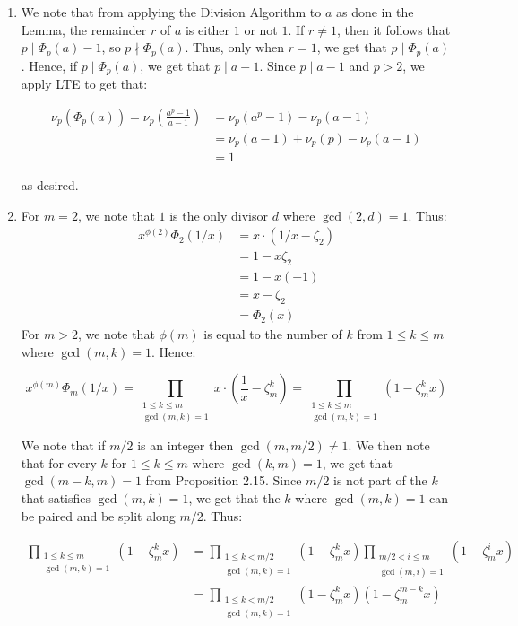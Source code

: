 \documentclass{article}
\begin{document}
\begin{enumerate}
\begin{enumerate}
    \item 
    We note that from applying the Division Algorithm to $a$ as done in the Lemma, the remainder $r$ of $a$ is either $1$ or not $1$. If $r \neq 1$, then it follows that $p \mid \Phi_p(a) - 1$, so $p \nmid \Phi_p(a)$. Thus, only when $r = 1$, we get that $p \mid \Phi_p(a)$. Hence, if $p \mid \Phi_p(a)$, we get that $p \mid a - 1$. Since $p \mid a - 1$ and $p > 2$, we apply LTE to get that: 

    \begin{align*}
        \nu_p(\Phi_p(a)) = \nu_p\left(\frac{a^p - 1}{a - 1}\right) &= \nu_p(a^p - 1) - \nu_p(a-1)\\
        &= \nu_p(a - 1) + \nu_p(p) - \nu_p(a-1)\\
        &= 1
    \end{align*}    

    as desired. \\

    \item 
    For $m = 2$, we note that $1$ is the only divisor $d$ where $\gcd(2, d) = 1$. Thus:
    \begin{align*}
        x^{\phi(2)}\Phi_2(1/x) &= x \cdot (1/x - \zeta_2) \\
        &= 1 - x\zeta_2 \\ 
        &= 1 - x(-1) \\\
        &= x - \zeta_2\\
        &= \Phi_2(x)
    \end{align*}
    For $m > 2$, we note that $\phi(m)$ is equal to the number of $k$ from $1 \leq k \leq m$ where $\gcd(m, k) = 1$. Hence:

    $$x^{\phi(m)}\Phi_m(1/x) = \prod_{\substack{1 \leq k \leq m \\\gcd(m,k) = 1}}x \cdot \left(\frac{1}{x}-\zeta_m^k\right) = \prod_{\substack{1 \leq k \leq m \\\gcd(m,k) = 1}} (1-\zeta_m^kx) $$
    
    We note that if $m/2$ is an integer then $\gcd(m, m/2) \neq 1$. We then note that for every $k$ for $1 \leq k \leq m$ where $\gcd(k,m) = 1$, we get that $\gcd(m -k, m) = 1$ from Proposition 2.15. Since $m/2$ is not part of the $k$ that satisfies $\gcd(m, k) = 1$, we get that the $k$ where $\gcd(m, k) = 1$ can be paired and be split along $m/2$. Thus: 

    \begin{align*}
        \prod_{\substack{1 \leq k \leq m \\\gcd(m,k) = 1}} (1-\zeta_m^kx) &= \prod_{\substack{1 \leq k < m/2 \\\gcd(m,k) = 1}} (1-\zeta_m^kx) \prod_{\substack{m/2 < i \leq m \\\gcd(m,i) = 1}} (1-\zeta_m^ix) \\
        &= \prod_{\substack{1 \leq k < m/2 \\\gcd(m,k) = 1}} (1-\zeta_m^kx) (1 - \zeta_m^{m-k}x) 
    \end{align*}


\end{enumerate}
\end{enumerate}
\end{document}
